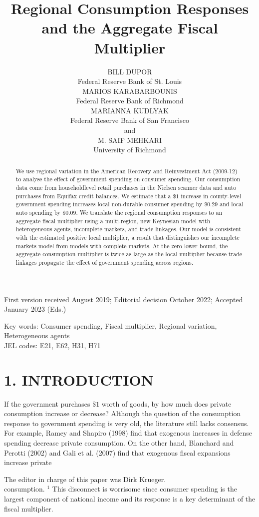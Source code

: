 \documentclass[10pt]{article}
\title{Regional Consumption Responses and the Aggregate Fiscal Multiplier }
\author{BILL DUPOR\\
Federal Reserve Bank of St. Louis\\
MARIOS KARABARBOUNIS\\
Federal Reserve Bank of Richmond\\
MARIANNA KUDLYAK\\
Federal Reserve Bank of San Francisco\\
and\\
M. SAIF MEHKARI\\
University of Richmond}
\date{}
\begin{document}
\maketitle
\captionsetup{singlelinecheck=false}
First version received August 2019; Editorial decision October 2022; Accepted January 2023 (Eds.)

\begin{abstract}
We use regional variation in the American Recovery and Reinvestment Act (2009-12) to analyse the effect of government spending on consumer spending. Our consumption data come from householdlevel retail purchases in the Nielsen scanner data and auto purchases from Equifax credit balances. We estimate that a $\$ 1$ increase in county-level government spending increases local non-durable consumer spending by $\$ 0.29$ and local auto spending by $\$ 0.09$. We translate the regional consumption responses to an aggregate fiscal multiplier using a multi-region, new Keynesian model with heterogeneous agents, incomplete markets, and trade linkages. Our model is consistent with the estimated positive local multiplier, a result that distinguishes our incomplete markets model from models with complete markets. At the zero lower bound, the aggregate consumption multiplier is twice as large as the local multiplier because trade linkages propagate the effect of government spending across regions.
\end{abstract}

Key words: Consumer spending, Fiscal multiplier, Regional variation, Heterogeneous agents\\
JEL codes: E21, E62, H31, H71

\section*{1. INTRODUCTION}
If the government purchases $\$ 1$ worth of goods, by how much does private consumption increase or decrease? Although the question of the consumption response to government spending is very old, the literature still lacks consensus. For example, Ramey and Shapiro (1998) find that exogenous increases in defense spending decrease private consumption. On the other hand, Blanchard and Perotti (2002) and Gali et al. (2007) find that exogenous fiscal expansions increase private

The editor in charge of this paper was Dirk Krueger.\\
consumption. ${ }^{1}$ This disconnect is worrisome since consumer spending is the largest component of national income and its response is a key determinant of the fiscal multiplier.
\end{document}
